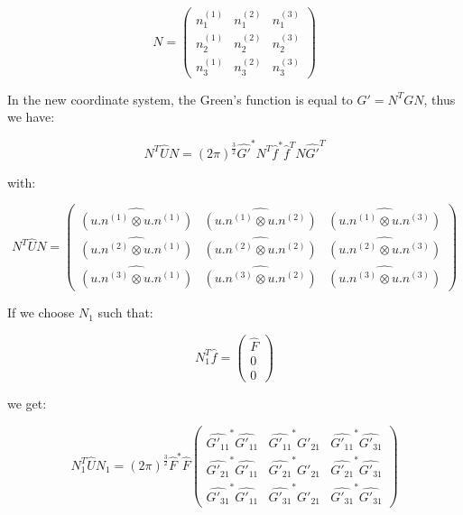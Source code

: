 \documentclass[methods.tex]{subfiles}
\begin{document}
\begin{equation}
N = \begin{pmatrix}
n_1^{(1)} & n_1^{(2)} & n_1^{(3)} \\
n_2^{(1)} & n_2^{(2)} & n_2^{(3)} \\
n_3^{(1)} & n_3^{(2)} & n_3^{(3)}
\end{pmatrix}
\end{equation}

In the new coordinate system, the Green's function is equal to $G' = N^T G N$, thus we have:

\begin{equation}
N^T \hat{U} N = (2 \pi)^{\frac{3}{2}} \hat{G'}^* N^T \hat{f}^* \hat{f}^T N \hat{G'}^T
\end{equation}

with:

\begin{equation}
N^T \hat{U} N = \begin{pmatrix}
\hat{(u . n^{(1)} \otimes u . n^{(1)})} & \hat{(u . n^{(1)} \otimes u . n^{(2)})} & \hat{(u . n^{(1)} \otimes u . n^{(3)})} \\
\hat{(u . n^{(2)} \otimes u . n^{(1)})} & \hat{(u . n^{(2)} \otimes u . n^{(2)})} & \hat{(u . n^{(2)} \otimes u . n^{(3)})} \\
\hat{(u . n^{(3)} \otimes u . n^{(1)})} & \hat{(u . n^{(3)} \otimes u . n^{(2)})} & \hat{(u . n^{(3)} \otimes u . n^{(3)})}
\end{pmatrix}
\end{equation}

If we choose $N_1$ such that:

\begin{equation}
N_1^T \hat{f} = \begin{pmatrix}
\hat{F} \\
0 \\
0
\end{pmatrix}
\end{equation}

we get:

\begin{equation}
N_1^T \hat{U} N_1 = (2 \pi)^{\frac{3}{2}} \hat{F}^* \hat{F} \begin{pmatrix}
\hat{G'_{11}}^* \hat{G'_{11}} & \hat{G'_{11}}^* \hat{G'_{21}} & \hat{G'_{11}}^* \hat{G'_{31}} \\
\hat{G'_{21}}^* \hat{G'_{11}} & \hat{G'_{21}}^* \hat{G'_{21}} & \hat{G'_{21}}^* \hat{G'_{31}} \\
\hat{G'_{31}}^* \hat{G'_{11}} & \hat{G'_{31}}^* \hat{G'_{21}} & \hat{G'_{31}}^* \hat{G'_{31}}
\end{pmatrix}
\end{equation}
\end{document}
